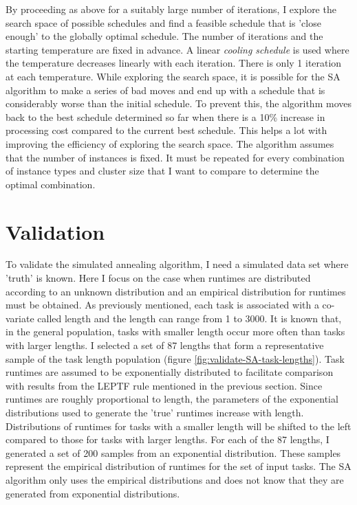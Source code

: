 \documentclass[12pt]{report}
\begin{document}
By proceeding as above for a suitably large number of iterations, I explore the search space of possible schedules and find a feasible schedule that is 'close enough' to the globally optimal schedule. 
The number of iterations and the starting temperature are fixed in advance.
A linear \textit{cooling schedule} is used where the temperature decreases linearly with each iteration.
There is only 1 iteration at each temperature. 
While exploring the search space, it is possible for the SA algorithm to make a series of bad moves and end up with a schedule that is considerably worse than the initial schedule.
To prevent this, the algorithm moves back to the best schedule determined so far when there is a 10\% increase in processing cost compared to the current best schedule.
This helps a lot with improving the efficiency of exploring the search space.
The algorithm assumes that the number of instances is fixed.
It must be repeated for every combination of instance types and cluster size that I want to compare to determine the optimal combination.

\section{Validation}

To validate the simulated annealing algorithm, I need a simulated data set where 'truth' is known.
Here I focus on the case when runtimes are distributed according to an unknown distribution and an empirical distribution for runtimes must be obtained.
As previously mentioned, each task is associated with a co-variate called length and the length can range from 1 to 3000.
It is known that, in the general population, tasks with smaller length occur more often than tasks with larger lengths.
I selected a set of 87 lengths that form a representative sample of the task length population (figure \ref{fig:validate-SA-task-lengths}).
Task runtimes are assumed to be exponentially distributed to facilitate comparison with results from the LEPTF rule mentioned in the previous section.
Since runtimes are roughly proportional to length, the parameters of the exponential distributions used to generate the 'true' runtimes increase with length.
Distributions of runtimes for tasks with a smaller length will be shifted to the left compared to those for tasks with larger lengths.
For each of the 87 lengths, I generated a set of 200 samples from an exponential distribution.
These samples represent the empirical distribution of runtimes for the set of input tasks. 
The SA algorithm only uses the empirical distributions and does not know that they are generated from exponential distributions.
\end{document}
